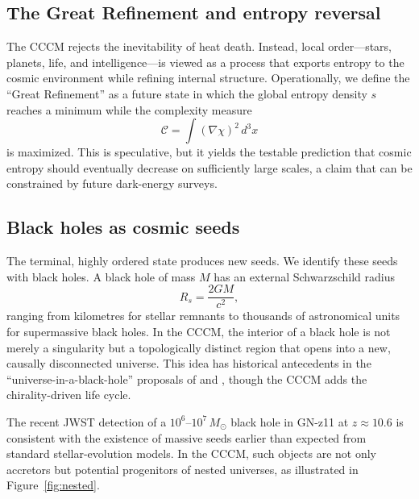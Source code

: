 \documentclass[a4paper,11pt]{article}
\newcommand{\CCCM}{CCCM}
\begin{document}
\subsection{The Great Refinement and entropy reversal}

The \CCCM{} rejects the inevitability of heat death. Instead, local order---stars, planets, life, and intelligence---is viewed as a process that exports entropy to the cosmic environment while refining internal structure. Operationally, we define the ``Great Refinement'' as a future state in which the global entropy density $s$ reaches a minimum while the complexity measure
\begin{equation}
    \mathcal{C} = \int \left(\nabla \chi\right)^2 \, d^3x
    \label{eq:complexity}
\end{equation}
is maximized. This is speculative, but it yields the testable prediction that cosmic entropy should eventually decrease on sufficiently large scales, a claim that can be constrained by future dark-energy surveys.

\subsection{Black holes as cosmic seeds}

The terminal, highly ordered state produces new seeds. We identify these seeds with black holes. A black hole of mass $M$ has an external Schwarzschild radius
\begin{equation}
    R_s = \frac{2GM}{c^2},
    \label{eq:schwarzschild}
\end{equation}
ranging from kilometres for stellar remnants to thousands of astronomical units for supermassive black holes. In the \CCCM, the interior of a black hole is not merely a singularity but a topologically distinct region that opens into a new, causally disconnected universe. This idea has historical antecedents in the ``universe-in-a-black-hole'' proposals of \citet{Pathria1972} and \citet{Poplawski2010}, though the \CCCM{} adds the chirality-driven life cycle.

The recent JWST detection of a $10^6$--$10^7\,M_\odot$ black hole in GN-z11 at $z \approx 10.6$ \citep{Johnson2024} is consistent with the existence of massive seeds earlier than expected from standard stellar-evolution models. In the \CCCM, such objects are not only accretors but potential progenitors of nested universes, as illustrated in Figure~\ref{fig:nested}.
\end{document}
